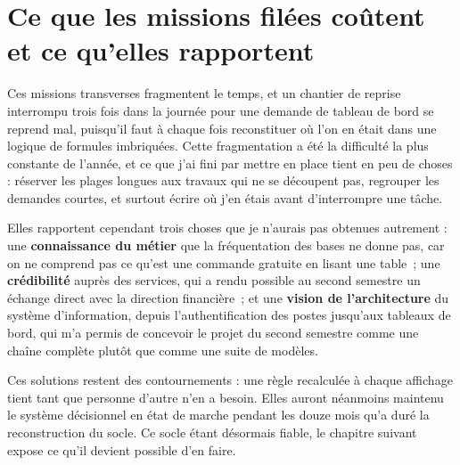 \hypertarget{ce-que-les-missions-filuxe9es-couxfbtent-et-ce-quelles-rapportent}{%
\section{Ce que les missions filées coûtent et ce qu'elles rapportent}\label{ce-que-les-missions-filuxe9es-couxfbtent-et-ce-quelles-rapportent}}

Ces missions transverses fragmentent le temps, et un chantier de reprise interrompu trois fois
dans la journée pour une demande de tableau de bord se reprend mal, puisqu'il faut à chaque
fois reconstituer où l'on en était dans une logique de formules imbriquées. Cette
fragmentation a été la difficulté la plus constante de l'année, et ce que j'ai fini par mettre
en place tient en peu de choses : réserver les plages longues aux travaux qui ne se découpent
pas, regrouper les demandes courtes, et surtout écrire où j'en étais avant d'interrompre une
tâche.

Elles rapportent cependant trois choses que je n'aurais pas obtenues autrement : une
\textbf{connaissance du métier} que la fréquentation des bases ne donne pas, car on ne comprend pas
ce qu'est une commande gratuite en lisant une table~; une \textbf{crédibilité} auprès des services,
qui a rendu possible au second semestre un échange direct avec la direction financière~; et
une \textbf{vision de l'architecture} du système d'information, depuis l'authentification des postes
jusqu'aux tableaux de bord, qui m'a permis de concevoir le projet du second semestre comme une
chaîne complète plutôt que comme une suite de modèles.

Ces solutions restent des contournements : une règle recalculée à chaque affichage tient tant
que personne d'autre n'en a besoin. Elles auront néanmoins maintenu le système décisionnel en
état de marche pendant les douze mois qu'a duré la reconstruction du socle. Ce socle étant
désormais fiable, le chapitre suivant expose ce qu'il devient possible d'en faire.
